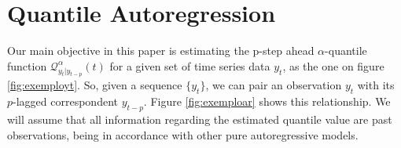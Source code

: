 \documentclass[a4paper]{IEEEtran}
\begin{document}





















\section{Quantile Autoregression}

Our main objective in this paper is estimating the p-step ahead $\alpha$-quantile function $\mathcal{Q}_{y_t|y_{t-p}}^\alpha(t)$ for a given set of time series data $y_t$, as the one on figure \ref{fig:exemployt}. So, given a sequence $\{y_t\}$, we can pair an observation $y_t$ with its $p$-lagged correspondent $y_{t-p}$. Figure \ref{fig:exemploar} shows this relationship. We will assume that all information regarding the estimated quantile value are past observations, being in accordance with other pure autoregressive models.  
\end{document}
